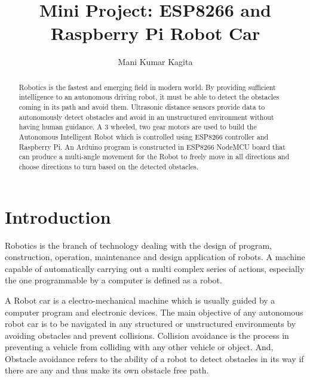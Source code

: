 \documentclass[sigconf]{acmart}
\begin{document}
\title{Mini Project: ESP8266 and Raspberry Pi Robot Car}

\author{Mani Kumar Kagita}


\begin{abstract}
Robotics is the fastest and emerging field in modern world. By providing sufficient intelligence to an autonomous driving robot, it must be able to detect the obstacles coming in its path and avoid them. Ultrasonic distance sensors provide data to autonomously detect obstacles and avoid in an unstructured environment without having human guidance. A 3 wheeled, two gear motors are used to build the Autonomous Intelligent Robot which is controlled using ESP8266 controller and Raspberry Pi. An Arduino program is constructed in ESP8266 NodeMCU board that can produce a multi-angle movement for the Robot to freely move in all directions and choose directions to turn based on the detected obstacles. 

\end{abstract}


\maketitle

\section{Introduction}
Robotics is the branch of technology dealing with the design of program, construction, operation, maintenance and design application of robots. A machine capable of automatically carrying out a multi complex series of actions, especially the one programmable by a computer is defined as a robot. 

A Robot car is a electro-mechanical machine which is usually guided by a computer program and electronic devices. The main objective of any autonomous robot car is to be navigated in any structured or unstructured environments by avoiding obstacles and prevent collisions. 
Collision avoidance is the process in preventing a vehicle from colliding with any other vehicle or object. And, Obstacle avoidance refers to the ability of a robot to detect obstacles in its way if there are any and thus make its own obstacle free path.
\end{document}
